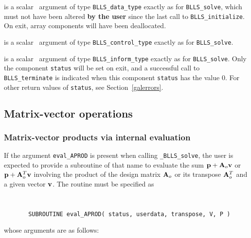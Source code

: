 \documentclass{galahad}
\newcommand{\packagename}{BLLS}
\newcommand{\fullpackagename}{\libraryname\_\packagename}
\newcommand{\solver}{{\tt \fullpackagename\_solve}}
\begin{document}
\vspace*{-3mm}
\begin{description}

 is a scalar \intentinout\ argument of type
{\tt \packagename\_data\_type}
exactly as for
{\tt \packagename\_solve},
which must not have been altered {\bf by the user} since the last call to
{\tt \packagename\_initialize}.
On exit, array components will have been deallocated.

 is a scalar \intentin\ argument of type
{\tt \packagename\_control\_type}
exactly as for
{\tt \packagename\_solve}.

 is a scalar \intentout\ argument of type
{\tt \packagename\_inform\_type}
exactly as for
{\tt \packagename\_solve}.
Only the component {\tt status} will be set on exit, and a
successful call to
{\tt \packagename\_terminate}
is indicated when this  component {\tt status} has the value 0.
For other return values of {\tt status}, see Section~\ref{galerrors}.

\end{description}



\subsection{Matrix-vector operations\label{fdv}}


\subsubsection{Matrix-vector products via internal evaluation\label{jvp}}

If the argument {\tt eval\_APROD} is present when calling \solver, the
user is expected to provide a subroutine of that name to evaluate the
sum ${\mathbf{p}} + {\mathbf{A}}_o {\mathbf{v}}$ or ${\mathbf{p}} + {\mathbf{A}}_o^T{\mathbf{v}}$ involving the
product of the design matrix ${\mathbf{A}}_o$ or its transpose ${\mathbf{A}}_o^T$
and a given vector ${\mathbf{v}}$.
The routine must be specified as

\def\baselinestretch{0.8}
{\tt
\begin{verbatim}
       SUBROUTINE eval_APROD( status, userdata, transpose, V, P )
\end{verbatim} }
\def\baselinestretch{1.0}
\noindent whose arguments are as follows:
\end{document}

